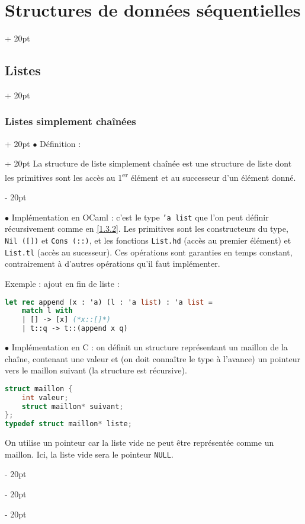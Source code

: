 \documentclass[a4paper, 12pt, twoside]{article}
\newcommand{\ind}[1][20pt]{\advance\leftskip + #1}
\newcommand{\deind}[1][20pt]{\advance\leftskip - #1}
\newenvironment{indt}[2][20pt]{#2 \par \ind[#1]}{\par \deind} %
\begin{document}
\begin{indt}{\section{Structures de données séquentielles}}
\begin{indt}{\subsection{Listes}}
            \begin{indt}{\subsubsection{Listes simplement chaînées}}
                \begin{indt}{$\bullet$ Définition :}
                    La structure de liste simplement chaînée est une structure de liste dont les primitives sont les accès au 1\textsuperscript{er} élément et au successeur d'un élément donné.
                \end{indt}
                
                \vspace{6pt}
                
                $\bullet$ Implémentation en OCaml : c'est le type \texttt{'a list} que l'on peut définir récursivement comme en \ref{1.3.2}. Les primitives sont les constructeurs du type, \texttt{Nil ([])} et \texttt{Cons (::)}, et les fonctions \texttt{List.hd} (accès au premier élément) et \texttt{List.tl} (accès au sucesseur).
                Ces opérations sont garanties en temps constant, contrairement à d'autres opérations qu'il faut implémenter.
                
                \vspace{6pt}
                
                Exemple : ajout en fin de liste :
                \begin{lstlisting}[language=Caml, xleftmargin=80pt]
let rec append (x : 'a) (l : 'a list) : 'a list =
    match l with
    | [] -> [x] (*x::[]*)
    | t::q -> t::(append x q)\end{lstlisting}
                
                \vspace{6pt}
                
                $\bullet$ Implémentation en C : on définit un structure représentant un maillon de la chaîne, contenant une valeur et (on doit connaître le type à l'avance) un pointeur vers le maillon suivant (la structure est récursive).
                
                \begin{lstlisting}[language=C, xleftmargin=80pt]
struct maillon {
    int valeur;
    struct maillon* suivant;
};
typedef struct maillon* liste;\end{lstlisting}
                
                On utilise un pointeur car la liste vide ne peut être représentée comme un maillon. Ici, la liste vide sera le pointeur \texttt{NULL}.
                

\end{indt}
\end{indt}
\end{indt}
\end{document}
